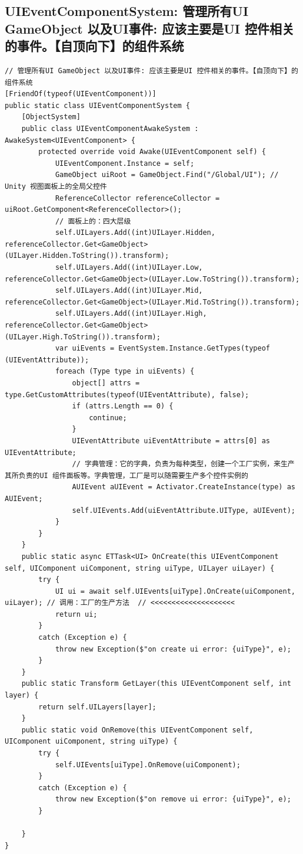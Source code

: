 \documentclass[9pt, b5paper]{article}
\begin{document}
\subsection{UIEventComponentSystem: 管理所有UI GameObject 以及UI事件: 应该主要是UI 控件相关的事件。【自顶向下】的组件系统}
\label{sec-7-6}
\begin{verbatim}
// 管理所有UI GameObject 以及UI事件: 应该主要是UI 控件相关的事件。【自顶向下】的组件系统
[FriendOf(typeof(UIEventComponent))]
public static class UIEventComponentSystem {
    [ObjectSystem]
    public class UIEventComponentAwakeSystem : AwakeSystem<UIEventComponent> {
        protected override void Awake(UIEventComponent self) {
            UIEventComponent.Instance = self;
            GameObject uiRoot = GameObject.Find("/Global/UI"); // Unity 视图面板上的全局父控件 
            ReferenceCollector referenceCollector = uiRoot.GetComponent<ReferenceCollector>();
            // 面板上的：四大层级
            self.UILayers.Add((int)UILayer.Hidden, referenceCollector.Get<GameObject>(UILayer.Hidden.ToString()).transform);
            self.UILayers.Add((int)UILayer.Low, referenceCollector.Get<GameObject>(UILayer.Low.ToString()).transform);
            self.UILayers.Add((int)UILayer.Mid, referenceCollector.Get<GameObject>(UILayer.Mid.ToString()).transform);
            self.UILayers.Add((int)UILayer.High, referenceCollector.Get<GameObject>(UILayer.High.ToString()).transform);
            var uiEvents = EventSystem.Instance.GetTypes(typeof (UIEventAttribute));
            foreach (Type type in uiEvents) {
                object[] attrs = type.GetCustomAttributes(typeof(UIEventAttribute), false);
                if (attrs.Length == 0) {
                    continue;
                }
                UIEventAttribute uiEventAttribute = attrs[0] as UIEventAttribute;
                // 字典管理：它的字典，负责为每种类型，创建一个工厂实例，来生产其所负责的UI 组件面板等。字典管理，工厂是可以随需要生产多个控件实例的
                AUIEvent aUIEvent = Activator.CreateInstance(type) as AUIEvent;
                self.UIEvents.Add(uiEventAttribute.UIType, aUIEvent);
            }
        }
    }
    public static async ETTask<UI> OnCreate(this UIEventComponent self, UIComponent uiComponent, string uiType, UILayer uiLayer) {
        try {
            UI ui = await self.UIEvents[uiType].OnCreate(uiComponent, uiLayer); // 调用：工厂的生产方法  // <<<<<<<<<<<<<<<<<<<< 
            return ui;
        }
        catch (Exception e) {
            throw new Exception($"on create ui error: {uiType}", e);
        }
    }
    public static Transform GetLayer(this UIEventComponent self, int layer) {
        return self.UILayers[layer];
    }
    public static void OnRemove(this UIEventComponent self, UIComponent uiComponent, string uiType) {
        try {
            self.UIEvents[uiType].OnRemove(uiComponent);
        }
        catch (Exception e) {
            throw new Exception($"on remove ui error: {uiType}", e);
        }

    }
}
\end{verbatim}
\end{document}
